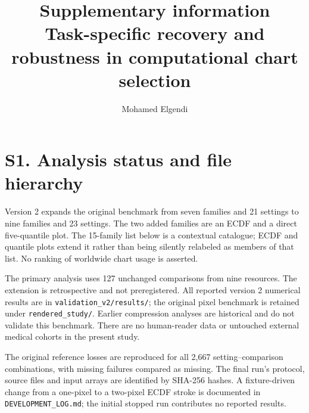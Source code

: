 \documentclass[10pt]{article}
\title{Supplementary information\\Task-specific recovery and robustness in computational chart selection}
\author{Mohamed Elgendi}\date{}
\begin{document}
\maketitle
\section*{S1. Analysis status and file hierarchy}
Version 2 expands the original benchmark from seven families and 21 settings to nine families and 23 settings. The two added families are an ECDF and a direct five-quantile plot. The 15-family list below is a contextual catalogue; ECDF and quantile plots extend it rather than being silently relabeled as members of that list. No ranking of worldwide chart usage is asserted.

The primary analysis uses 127 unchanged comparisons from nine resources. The extension is retrospective and not preregistered. All reported version 2 numerical results are in \texttt{validation\_v2/results/}; the original pixel benchmark is retained under \texttt{rendered\_study/}. Earlier compression analyses are historical and do not validate this benchmark. There are no human-reader data or untouched external medical cohorts in the present study.

The original reference losses are reproduced for all 2,667 setting--comparison combinations, with missing failures compared as missing. The final run's protocol, source files and input arrays are identified by SHA-256 hashes. A fixture-driven change from a one-pixel to a two-pixel ECDF stroke is documented in \texttt{DEVELOPMENT\_LOG.md}; the initial stopped run contributes no reported results.
\end{document}
